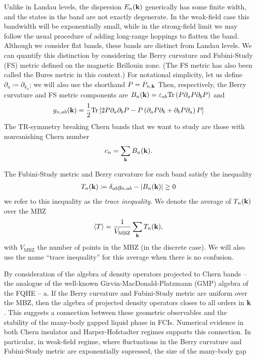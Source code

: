 \documentclass[aps,prb,twocolumn,letterpaper,twoside,nobalancelastpage,groupedaddress,amsmath,amssymb,floatfix,citeautoscript]{revtex4-1}
\begin{document}
Unlike in Landau levels, the dispersion $E_{n}({\bf k})$ generically has some finite width, and the states in the band are not exactly degenerate. In the weak-field case this bandwidth will be exponentially small\cite{Harper:2014vi}, while in the strong-field limit we may follow the usual procedure of adding long-range hoppings to flatten the band. \cite{Bergholtz:2013ue,Parameswaran2013} Although we consider flat bands, these bands are distinct from Landau levels. We can quantify this distinction by considering the Berry curvature and Fubini-Study (FS) metric defined on the magnetic Brillouin zone\cite{Parameswaran2012,Roy:2012vo,Claassen2015}. (The FS metric has also been called the Bures metric in this context.\cite{Palumbo2017}) For notational simplicity, let us define $\partial_a \coloneqq \partial_{k_a}$; we will also use the shorthand $P=P_{n,{\bf k}}$ Then, respectively, the Berry curvature and FS metric components are $B_n({\bf k}) = \varepsilon_{ab}\text{Tr}\left(P\partial_{a}P\partial_b P\right)$ and
\begin{align*}
g_{n,ab}({\bf k}) = \frac{1}{2}\text{Tr}\left[2P\partial_a\partial_bP - P\left(\partial_aP\partial_b+ \partial_bP\partial_a\right)P\right]\\
\end{align*}
The TR-symmetry breaking Chern bands that we want to study are those with nonvanishing Chern number 
\begin{align*}
c_n = \sum_{{\bf k}} B_n(\mathbf{k}).
\end{align*}

The Fubini-Study metric and Berry curvature for each band satisfy the inequality
\begin{align*}
T_n({\bf k}) \coloneqq \delta_{ab}g_{n,ab} - |B_n({\bf k})| \geq 0
\end{align*}
we refer to this inequality as the \textit{trace inequality}. We denote the average of $T_n({\bf k})$ over the MBZ
\begin{align*}
\expval{T} = \frac{1}{V_{\text{MBZ}}}\sum_{{\bf k}} T_n({\bf k}),
\end{align*}
with $V_{\text{MBZ}}$ the number of points in the MBZ (in the discrete case). We will also use the name ``trace inequality'' for this average when there is no confusion. 

By consideration of the algebra of density operators projected to Chern bands -- the analogue of the well-known Girvin-MacDonald-Platzmann (GMP) algebra of the FQHE\cite{Girvin:1986bu} -- a. If the Berry curvature and Fubini-Study metric are uniform over the MBZ, then the algebra of projected density operators closes to all orders in ${\bf k}$. This suggests a connection between these geometric observables and the stability of the many-body gapped liquid phase in FCIs. Numerical evidence in both Chern insulator and Harper-Hofstadter regimes supports this connection. In particular, in weak-field regime, where fluctuations in the Berry curvature and Fubini-Study metric are exponentially supressed, the size of the many-body gap
\end{document}
